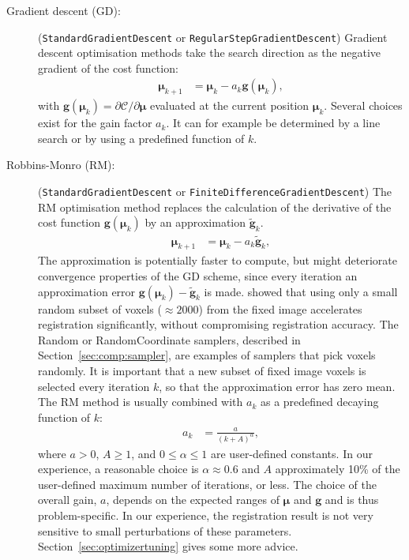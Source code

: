 \documentclass[]{report}
\newcommand{\vmu}{\bm{\mu}}
\begin{document}
\begin{description}
\item[Gradient descent (GD):] (\texttt{StandardGradientDescent}
or \texttt{RegularStepGradientDescent}) Gradient descent optimisation
methods take the search direction as the negative gradient of the
cost function:
\begin{align}
\vmu_{k+1} &= \vmu_k - a_k \bm{g}(\vmu_k),\label{eq:gd}
\end{align}
with $\bm{g}(\vmu_k) = \partial \mathcal{C} / \partial \vmu$
evaluated at the current position $\vmu_k$. Several choices exist for
the gain factor $a_k$. It can for example be determined by a line
search or by using a predefined function of $k$.

\item[Robbins-Monro (RM):]
(\texttt{StandardGradientDescent} or
\texttt{FiniteDifferenceGradientDescent}) The RM optimisation
method replaces the calculation of the derivative of the cost
function $\bm{g}(\vmu_k)$ by an approximation
$\widetilde{\bm{g}}_k$.
\begin{align}
\vmu_{k+1} &= \vmu_k - a_k \widetilde{\bm{g}}_k,\label{eq:RM}
\end{align}
The approximation is potentially faster to compute, but might
deteriorate convergence properties of the GD scheme, since every
iteration an approximation error $\bm{g}(\vmu_k) -
\widetilde{\bm{g}}_k$ is made. \citet{KleinEA07} showed that using
only a small random subset of voxels (\mbox{$\approx 2000$}) from
the fixed image accelerates registration significantly, without
compromising registration accuracy. The Random or RandomCoordinate
samplers, described in Section~\ref{sec:comp:sampler}, are
examples of samplers that pick voxels randomly. It is important
that a new subset of fixed image voxels is selected every
iteration $k$, so that the approximation error has zero mean. The
RM method is usually combined with $a_k$ as a predefined decaying
function of $k$:
\begin{align}
a_k &= \frac{a}{(k+A)^{\alpha}},\label{eq:gain}
\end{align}
where $a > 0$, $A \ge 1$, and $0 \le \alpha \le 1$ are
user-defined constants. In our experience, a reasonable choice is
$\alpha \approx 0.6$ and $A$ approximately 10\% of the
user-defined maximum number of iterations, or less. The choice of
the overall gain, $a$, depends on the expected ranges of $\vmu$
and $\bm{g}$ and is thus problem-specific. In our experience, the
registration result is not very sensitive to small perturbations
of these parameters. Section~\ref{sec:optimizertuning} gives some
more advice.
\end{description}
\end{document}
